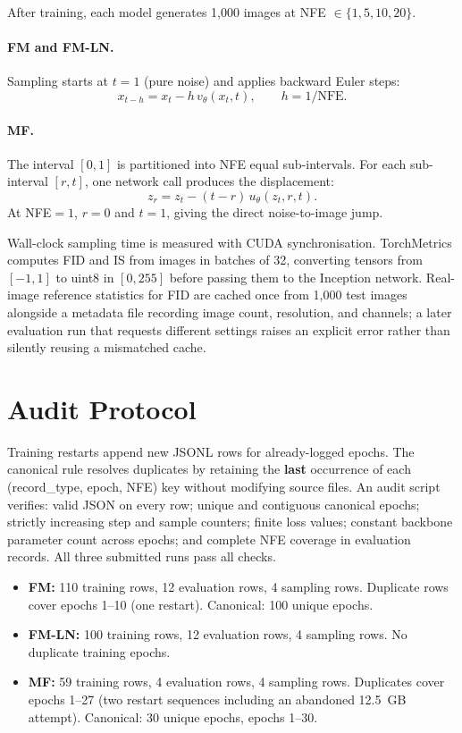 After training, each model generates 1{,}000 images at NFE $\in \{1, 5, 10, 20\}$.

\paragraph{FM and FM-LN.}
Sampling starts at $t=1$ (pure noise) and applies backward Euler steps:
\begin{equation}
  x_{t - h} = x_t - h\,v_\theta(x_t, t), \qquad h = 1/\mathrm{NFE}.
\end{equation}

\paragraph{MF.}
The interval $[0, 1]$ is partitioned into NFE equal sub-intervals. For each
sub-interval $[r, t]$, one network call produces the displacement:
\begin{equation}
  z_r = z_t - (t - r)\,u_\theta(z_t, r, t).
\end{equation}
At NFE$=1$, $r=0$ and $t=1$, giving the direct noise-to-image jump.

Wall-clock sampling time is measured with CUDA synchronisation.
TorchMetrics computes FID and IS from images in batches of 32, converting
tensors from $[-1, 1]$ to uint8 in $[0, 255]$ before passing them to the
Inception network. Real-image reference statistics for FID are cached once from
1{,}000 test images alongside a metadata file recording image count, resolution,
and channels; a later evaluation run that requests different settings raises an
explicit error rather than silently reusing a mismatched cache.

\section{Audit Protocol}\label{sec:audit}

Training restarts append new JSONL rows for already-logged epochs. The canonical
rule resolves duplicates by retaining the \textbf{last} occurrence of each
(record\_type, epoch, NFE) key without modifying source files. An audit script
verifies: valid JSON on every row; unique and contiguous canonical epochs;
strictly increasing step and sample counters; finite loss values; constant
backbone parameter count across epochs; and complete NFE coverage in evaluation
records. All three submitted runs pass all checks.

\begin{itemize}
  \item \textbf{FM:} 110 training rows, 12 evaluation rows, 4 sampling rows.
    Duplicate rows cover epochs 1--10 (one restart). Canonical: 100 unique epochs.
  \item \textbf{FM-LN:} 100 training rows, 12 evaluation rows, 4 sampling rows.
    No duplicate training epochs.
  \item \textbf{MF:} 59 training rows, 4 evaluation rows, 4 sampling rows.
    Duplicates cover epochs 1--27 (two restart sequences including an abandoned
    12.5~GB attempt). Canonical: 30 unique epochs, epochs 1--30.
\end{itemize}

